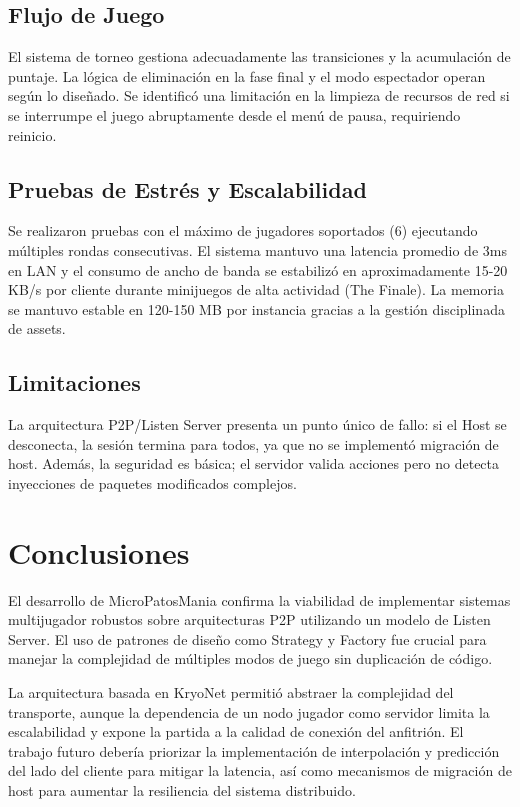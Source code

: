 \documentclass[conference]{IEEEtran}
\begin{document}
\subsection{Flujo de Juego}
El sistema de torneo gestiona adecuadamente las transiciones y la acumulación de puntaje. La lógica de eliminación en la fase final y el modo espectador operan según lo diseñado. Se identificó una limitación en la limpieza de recursos de red si se interrumpe el juego abruptamente desde el menú de pausa, requiriendo reinicio.

\subsection{Pruebas de Estrés y Escalabilidad}
Se realizaron pruebas con el máximo de jugadores soportados (6) ejecutando múltiples rondas consecutivas. El sistema mantuvo una latencia promedio de 3ms en LAN y el consumo de ancho de banda se estabilizó en aproximadamente 15-20 KB/s por cliente durante minijuegos de alta actividad (The Finale). La memoria se mantuvo estable en 120-150 MB por instancia gracias a la gestión disciplinada de assets.

\subsection{Limitaciones}
La arquitectura P2P/Listen Server presenta un punto único de fallo: si el Host se desconecta, la sesión termina para todos, ya que no se implementó migración de host. Además, la seguridad es básica; el servidor valida acciones pero no detecta inyecciones de paquetes modificados complejos.

\section{Conclusiones}

El desarrollo de MicroPatosMania confirma la viabilidad de implementar sistemas multijugador robustos sobre arquitecturas P2P utilizando un modelo de Listen Server. El uso de patrones de diseño como Strategy y Factory fue crucial para manejar la complejidad de múltiples modos de juego sin duplicación de código.

La arquitectura basada en KryoNet permitió abstraer la complejidad del transporte, aunque la dependencia de un nodo jugador como servidor limita la escalabilidad y expone la partida a la calidad de conexión del anfitrión. El trabajo futuro debería priorizar la implementación de interpolación y predicción del lado del cliente para mitigar la latencia, así como mecanismos de migración de host para aumentar la resiliencia del sistema distribuido.



\end{document}
